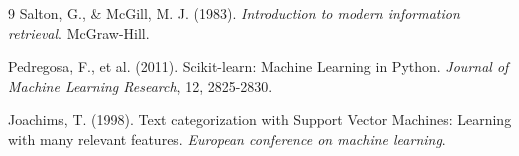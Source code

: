 \documentclass[a4paper,12pt]{article}
\begin{document}
\begin{thebibliography}{9}
Salton, G., \& McGill, M. J. (1983). \textit{Introduction to modern information retrieval}. McGraw-Hill.

Pedregosa, F., et al. (2011). Scikit-learn: Machine Learning in Python. \textit{Journal of Machine Learning Research}, 12, 2825-2830.

Joachims, T. (1998). Text categorization with Support Vector Machines: Learning with many relevant features. \textit{European conference on machine learning}.
\end{thebibliography}
\end{document}
